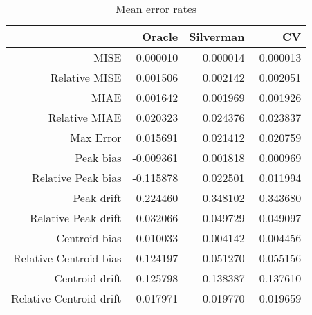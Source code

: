 \begin{table}[ht]
\centering
\begin{tabular}{rrrr}
  \hline
 & Oracle & Silverman & CV \\ 
  \hline
MISE & 0.000010 & 0.000014 & 0.000013 \\ 
  Relative MISE & 0.001506 & 0.002142 & 0.002051 \\ 
  MIAE & 0.001642 & 0.001969 & 0.001926 \\ 
  Relative MIAE & 0.020323 & 0.024376 & 0.023837 \\ 
  Max Error & 0.015691 & 0.021412 & 0.020759 \\ 
  Peak bias & -0.009361 & 0.001818 & 0.000969 \\ 
  Relative Peak bias & -0.115878 & 0.022501 & 0.011994 \\ 
  Peak drift & 0.224460 & 0.348102 & 0.343680 \\ 
  Relative Peak drift & 0.032066 & 0.049729 & 0.049097 \\ 
  Centroid bias & -0.010033 & -0.004142 & -0.004456 \\ 
  Relative Centroid bias & -0.124197 & -0.051270 & -0.055156 \\ 
  Centroid drift & 0.125798 & 0.138387 & 0.137610 \\ 
  Relative Centroid drift & 0.017971 & 0.019770 & 0.019659 \\ 
   \hline
\end{tabular}
\caption{Mean error rates} 
\label{tbl:mean_error_rates}
\end{table}

